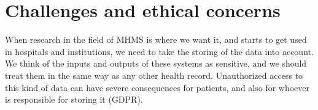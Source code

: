 \section{Challenges and ethical concerns}
When research in the field of MHMS is where we want it, and starts to get used in hospitals and institutions, we need to take the storing of the data into account. We think of the inputs and outputs of these systems as sensitive, and we should treat them in the same way as any other health record. Unauthorized access to this kind of data can have severe consequences for patients, and also for whoever is responsible for storing it (GDPR). 

